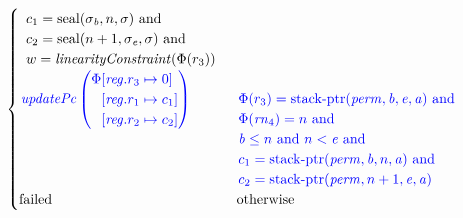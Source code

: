 \documentclass[a3paper]{article}
\newcommand{\tand}{\text{ and }}
\newcommand{\totherwise}{\text{otherwise }}
\newcommand{\sourcecolor}{\color{blue}}
\newcommand{\update}[2]{[#1 \mapsto #2]}
\newcommand{\updReg}[2]{\update{\reg.#1}{#2}}
\newcommand{\shareddom}[1]{\mathrm{#1}}
\newcommand{\perm}{\var{perm}}
\newcommand{\stkptr}[1]{\mathrm{stack\text{-}ptr}(#1)}
\newcommand{\seal}[1]{\shareddom{seal}(#1)}
\newcommand{\failed}{\mathrm{failed}}
\newcommand{\var}[1]{\mathit{#1}}
\newcommand{\rn}{\var{rn}}
\newcommand{\reg}{\var{reg}}
\newcommand{\baddr}{\var{b}}
\newcommand{\eaddr}{\var{e}}
\newcommand{\aaddr}{\var{a}}
\newcommand{\plainfun}[2]{
  \ifthenelse{\equal{#2}{}}
  {\mathit{#1}}
  {\mathit{#1}(#2)}
}
\newcommand{\linCons}[1]{\plainfun{linearityConstraint}{#1}}
\newcommand{\updPcAddr}[1]{\plainfun{updatePc}{#1}}
\begin{document}
\begin{align*}
\begin{cases}
\begin{array}[t]{l}
                                   c_1 = \seal{\sigma_\baddr,n,\sigma} \tand \\
                                   c_2 = \seal{n+1,\sigma_\eaddr,\sigma} \tand \\
                                   w = \linCons{\Phi(r_3)}
                                 \end{array}\\
                                   \sourcecolor\left.
                                   \updPcAddr{}\left(
                                   \arraycolsep=0pt
                                   \begin{array}{rl}
                                     \Phi&\updReg{r_3}{0}\\
                                               &\updReg{r_1}{c_1}\\
                                               &\updReg{r_2}{c_2}
                                   \end{array} \right)\right.
&
                                 \sourcecolor\left.
                                 \arraycolsep=0pt
                                 \begin{array}[t]{l}
                                   \Phi(r_3) = \stkptr{\perm,\baddr,\eaddr,\aaddr} \tand \\
                                   \Phi(\rn_4) = n \tand \\
                                   \baddr \leq n \tand n < \eaddr \tand \\
                                   c_1 = \stkptr{\perm,\baddr,n,\aaddr} \tand \\
                                   c_2 = \stkptr{\perm,n+1,\eaddr,\aaddr} 
                                 \end{array} \right.\\
                                 \failed & \totherwise
                               \end{cases}
\end{align*}
\end{document}
